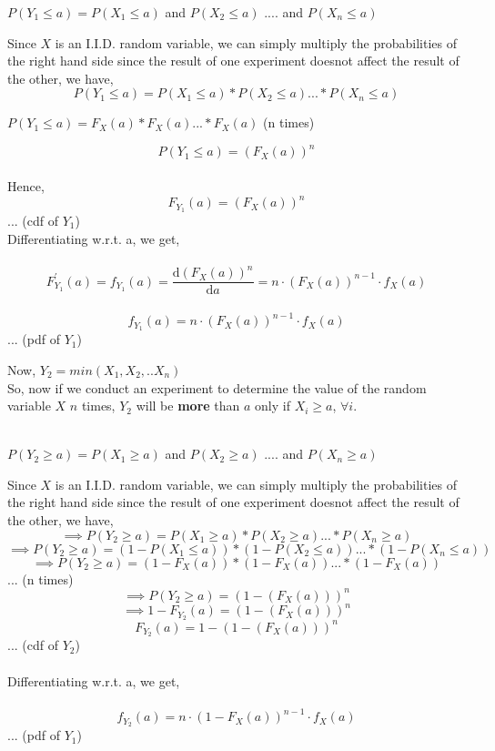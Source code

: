 \documentclass[11pt]{article}
\begin{document}
\begin{enumerate}
{		\begin{center}
			$P(Y_1 \leq a) = P(X_1 \leq a) $ and $ P(X_2 \leq a)$ .... and $P(X_n \leq a)$
		\end{center}
		Since $X$ is an I.I.D. random variable, we can simply multiply the probabilities of the right hand side since the result of one experiment doesnot affect the result of the other, we have, \\
		$$P(Y_1 \leq a) = P(X_1 \leq a)*P(X_2 \leq a) ... *P(X_n \leq a)$$
		\begin{center}
			$P(Y_1 \leq a) = F_X{(a)}*F_X{(a)} ... *F_X{(a)}$  (n times) \\
		\end{center}
		$$P(Y_1 \leq a) = {(F_X(a))}^n$$
		\\
		Hence, $$F_{Y_1}(a) = (F_{X}(a))^n$$	\hfill{... (cdf of $Y_1$)} \\
		Differentiating w.r.t. a, we get, \\ \\
		$$F^{'}_{Y_1}(a) = f_{Y_1}(a) = \frac{\mathrm{d}(F_{X}(a))^n }{\mathrm{d} a}  = n\cdot (F_{X}(a))^{n-1}\cdot f_X(a)$$\\
		$$f_{Y_1}(a) = n\cdot (F_{X}(a))^{n-1}\cdot f_X(a)$$ \hfill{... (pdf of $Y_1$)} 

		Now, $Y_2 = min(X_1,X_2,..X_n)$ \\

		So, now if we conduct an experiment to determine the value of the random variable $X$ $n$ times, $Y_2$ will be \textbf{more} than $a$ only if $X_i \geq a$, $ \forall{i} $. \\ \\

		\begin{center}
			$P(Y_2 \geq a) = P(X_1 \geq a) $ and $ P(X_2 \geq a)$ .... and $P(X_n \geq a)$
		\end{center}

		Since $X$ is an I.I.D. random variable, we can simply multiply the probabilities of the right hand side since the result of one experiment doesnot affect the result of the other, we have, \\

		$$\implies P(Y_2 \geq a) = P(X_1 \geq a)*P(X_2 \geq a) ... *P(X_n \geq a)$$
		$$\implies P(Y_2 \geq a) = (1-P(X_1 \leq a))*(1-P(X_2 \leq a)) ... *(1-P(X_n \leq a))$$
		$$\implies P(Y_2 \geq a) = (1-F_X{(a)})*(1-F_X{(a)}) ... * (1-F_X{(a)})$$ \hfill{... (n times)} \\
		$$\implies P(Y_2 \geq a) = (1-{(F_X(a))})^n$$
		$$\implies 1- F_{Y_2}(a) = (1-{(F_X(a))})^n$$
		$$F_{Y_2}(a) = 1 - (1-{(F_X(a))})^n $$ \hfill{... (cdf of $Y_2$)} \\
		\\Differentiating w.r.t. a, we get, \\ \\
		$$f_{Y_2}(a) = n\cdot (1-F_{X}(a))^{n-1}\cdot f_X(a)$$ \hfill{... (pdf of $Y_1$)} \\
	}


\end{enumerate}
\end{document}
